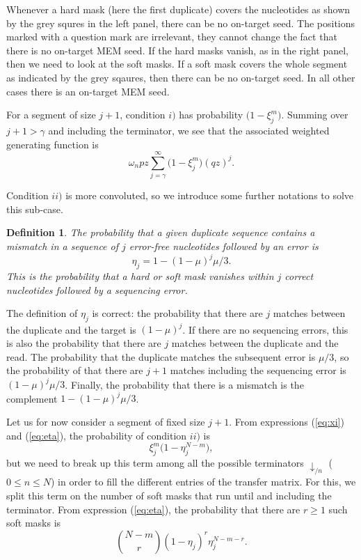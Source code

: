 \documentclass{article}
\newtheorem{definition}{Definition}
\begin{document}
Whenever a hard mask (here the first duplicate) covers the nucleotides as
shown by the grey squres in the left panel, there can be no on-target
seed. The positions marked with a question mark are irrelevant, they
cannot change the fact that there is no on-target MEM seed. If the hard
masks vanish, as in the right panel, then we need to look at the soft
masks. If a soft mask covers the whole segment as indicated by the grey
sqaures, then there can be no on-target seed. In all other cases there is
an on-target MEM seed.

For a segment of size $j+1$, condition $i)$ has probability $\big(1 -
\xi_j^m \big)$. Summing over $j+1 > \gamma$ and including the terminator,
we see that the associated weighted generating function is
\begin{equation*}
\omega_n pz \sum_{j=\gamma}^\infty \Big(1 - \xi_j^m \Big) (qz)^j.
\end{equation*}

Condition $ii)$ is more convoluted, so we introduce some further
notations to solve this sub-case.
\begin{definition}
The probability that a given duplicate sequence contains a mismatch in a
sequence of $j$ error-free nucleotides followed by an error is
\begin{equation}
\label{eq:eta}
\eta_j = 1-(1-\mu)^j\mu/3.
\end{equation}
This is the probability that a hard or soft mask vanishes within $j$
correct nucleotides followed by a sequencing error.
\end{definition}

The definition of $\eta_j$ is correct: the probability that there are $j$
matches between the duplicate and the target is $(1-\mu)^j$. If there are
no sequencing errors, this is also the probability that there are $j$
matches between the duplicate and the read. The probability that the
duplicate matches the subsequent error is $\mu/3$, so the probability of
that there are $j+1$ matches including the sequencing error is
$(1-\mu)^j\mu/3$. Finally, the probability that there is a mismatch is the
complement $1-(1-\mu)^j\mu/3$.

Let us for now consider a segment of fixed size $j+1$. From expressions
(\ref{eq:xi}) and (\ref{eq:eta}), the probability of condition $ii)$ is
\begin{equation*}
\xi_j^m \Big(1 - \eta_j^{N-m} \Big),
\end{equation*}
but we need to break up this term among all the possible terminators
$\downarrow_{/n}$ ($0 \leq n \leq N$) in order to fill the different
entries of the transfer matrix. For this, we split this term on the number
of soft masks that run until and including the terminator. From expression
(\ref{eq:eta}), the probability that there are $r \geq 1$ such soft masks
is
\begin{equation}
\label{eq:softmasks_r}
{N-m \choose r} (1 - \eta_j)^r \eta_j^{N-m-r}.
\end{equation}
\end{document}
